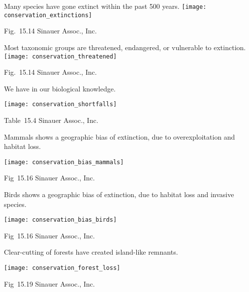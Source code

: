 \documentclass[t]{beamer}
\begin{document}
\begin{frame}{Many species have gone extinct within the past 500 years.}
	\centering%
	\texttt{[image: conservation\_extinctions]}
	
	\tinyfill Fig.~15.14 \textcopyright Sinauer Assoc., Inc.
\end{frame}

\begin{frame}{Most taxonomic groups are threatened, endangered, or vulnerable to extinction.}
	\centering%
	\texttt{[image: conservation\_threatened]}
	
	\tinyfill Fig.~15.14 \textcopyright Sinauer Assoc., Inc.
\end{frame}

\begin{frame}{We have  in our biological knowledge.}

	\texttt{[image: conservation\_shortfalls]}
	
	\tinyfill Table~15.4 \textcopyright Sinauer Assoc., Inc.
\end{frame}

\begin{frame}{Mammals shows a geographic bias of extinction, due to overexploitation and habitat loss.}
	
	\centering
	
	\texttt{[image: conservation\_bias\_mammals]}
	
	\tinyfill Fig~15.16 \textcopyright Sinauer Assoc., Inc.
\end{frame}

\begin{frame}{Birds shows a geographic bias of extinction, due to habitat loss and invasive species.}
	
	\centering
	
	\texttt{[image: conservation\_bias\_birds]}
	
	\tinyfill Fig~15.16 \textcopyright Sinauer Assoc., Inc.
\end{frame}

\begin{frame}{Clear-cutting of forests have created island-like remnants.}
	
	\centering
	
	\texttt{[image: conservation\_forest\_loss]}
	
	\tinyfill Fig~15.19 \textcopyright Sinauer Assoc., Inc.
\end{frame}
\end{document}
